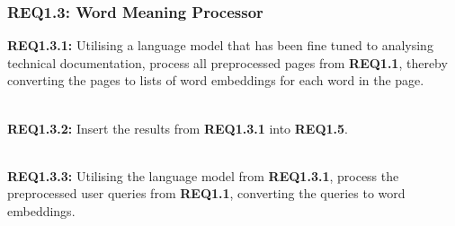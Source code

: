 \subsubsection{REQ1.3: Word Meaning Processor}

\textbf{REQ1.3.1:} Utilising a language model that has been fine tuned to analysing technical documentation, process all preprocessed pages from \textbf{REQ1.1}, thereby converting the pages to lists of word embeddings for each word in the page.\par

\textbf{\\REQ1.3.2:} Insert the results from \textbf{REQ1.3.1} into \textbf{REQ1.5}.\par

\textbf{\\REQ1.3.3:} Utilising the language model from \textbf{REQ1.3.1}, process the preprocessed user queries from \textbf{REQ1.1}, converting the queries to word embeddings.\par
